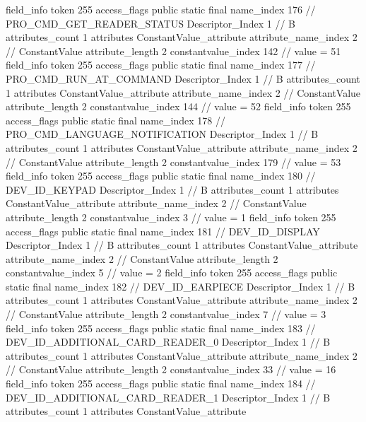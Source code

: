 {{{{{{{				}
				}
			}
			field_info {
				token	255
				access_flags	public static final
				name_index	176		// PRO_CMD_GET_READER_STATUS
				Descriptor_Index	1		// B
				attributes_count	1
				attributes {
				ConstantValue_attribute {
					attribute_name_index	2		// ConstantValue
					attribute_length	2
					constantvalue_index	142		// value = 51
				}
				}
			}
			field_info {
				token	255
				access_flags	public static final
				name_index	177		// PRO_CMD_RUN_AT_COMMAND
				Descriptor_Index	1		// B
				attributes_count	1
				attributes {
				ConstantValue_attribute {
					attribute_name_index	2		// ConstantValue
					attribute_length	2
					constantvalue_index	144		// value = 52
				}
				}
			}
			field_info {
				token	255
				access_flags	public static final
				name_index	178		// PRO_CMD_LANGUAGE_NOTIFICATION
				Descriptor_Index	1		// B
				attributes_count	1
				attributes {
				ConstantValue_attribute {
					attribute_name_index	2		// ConstantValue
					attribute_length	2
					constantvalue_index	179		// value = 53
				}
				}
			}
			field_info {
				token	255
				access_flags	public static final
				name_index	180		// DEV_ID_KEYPAD
				Descriptor_Index	1		// B
				attributes_count	1
				attributes {
				ConstantValue_attribute {
					attribute_name_index	2		// ConstantValue
					attribute_length	2
					constantvalue_index	3		// value = 1
				}
				}
			}
			field_info {
				token	255
				access_flags	public static final
				name_index	181		// DEV_ID_DISPLAY
				Descriptor_Index	1		// B
				attributes_count	1
				attributes {
				ConstantValue_attribute {
					attribute_name_index	2		// ConstantValue
					attribute_length	2
					constantvalue_index	5		// value = 2
				}
				}
			}
			field_info {
				token	255
				access_flags	public static final
				name_index	182		// DEV_ID_EARPIECE
				Descriptor_Index	1		// B
				attributes_count	1
				attributes {
				ConstantValue_attribute {
					attribute_name_index	2		// ConstantValue
					attribute_length	2
					constantvalue_index	7		// value = 3
				}
				}
			}
			field_info {
				token	255
				access_flags	public static final
				name_index	183		// DEV_ID_ADDITIONAL_CARD_READER_0
				Descriptor_Index	1		// B
				attributes_count	1
				attributes {
				ConstantValue_attribute {
					attribute_name_index	2		// ConstantValue
					attribute_length	2
					constantvalue_index	33		// value = 16
				}
				}
			}
			field_info {
				token	255
				access_flags	public static final
				name_index	184		// DEV_ID_ADDITIONAL_CARD_READER_1
				Descriptor_Index	1		// B
				attributes_count	1
				attributes {
				ConstantValue_attribute {
}}}}}}}
